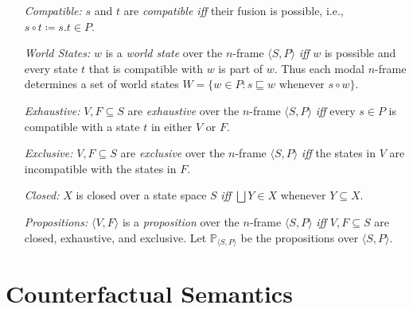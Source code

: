 \documentclass[a4paper, 11pt]{article} %
\newcommand{\tuple}[1]{\langle#1\rangle} %
\newcommand{\set}[1]{\lbrace#1\rbrace} %
\renewcommand{\P}[0]{\mathbb{P}}
\begin{document}
\begin{enumerate}
  \item[\it Compatible:] $s$ and $t$ are \textit{compatible iff} their fusion is possible, i.e., $s\circ t\coloneq s.t\in P$.
  \item[\it World States:] $w$ is a \textit{world state} over the $n$-frame $\tuple{S,P}$ \textit{iff} $w$ is possible and every state $t$ that is compatible with $w$ is part of $w$. 
    Thus each modal $n$-frame determines a set of world states $W=\set{w\in P: s\sqsubseteq w \text{ whenever } s\circ w}$.
  \item[\it Exhaustive:] $V,F\subseteq S$ are \textit{exhaustive} over the $n$-frame $\tuple{S,P}$ \textit{iff} every $s\in P$ is compatible with a state $t$ in either $V$ or $F$.
  \item[\it Exclusive:] $V,F\subseteq S$ are \textit{exclusive} over the $n$-frame $\tuple{S,P}$ \textit{iff} the states in $V$ are incompatible with the states in $F$.
  \item[\it Closed:] $X$ is closed over a state space $S$ \textit{iff} $\bigsqcup Y\in X$ whenever $Y\subseteq X$.
  \item[\it Propositions:] $\tuple{V,F}$ is a \textit{proposition} over the $n$-frame $\tuple{S,P}$ \textit{iff} $V,F\subseteq S$ are closed, exhaustive, and exclusive.
    Let $\P_{\tuple{S,P}}$ be the propositions over $\tuple{S,P}$.
\end{enumerate}




\section{Counterfactual Semantics}
\end{document}
